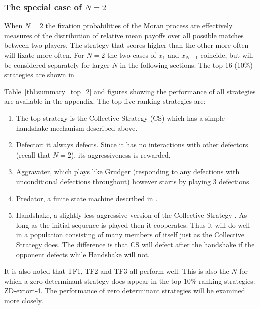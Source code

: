 \documentclass[10pt,letterpaper]{article}
\begin{document}
\subsubsection*{The special case of \(N=2\)}

When $N=2$ the fixation probabilities of the Moran process are effectively measures
of the distribution of  relative
mean payoffs over all possible matches between two players. The strategy
that scores higher than the other more often will fixate more often. For \(N=2\)
the two cases of \(x_1\) and \(x_{N-1}\) coincide, but will be
considered separately for larger \(N\) in the following sections.
The top 16 (10\%) strategies are
shown in

Table~\ref{tbl:summary_top_2} and figures showing the performance of all
strategies are available in the appendix.
The top five ranking strategies are:

\begin{enumerate}
    \item The top strategy is the Collective Strategy (CS) which has a simple
        handshake mechanism described above.
    \item Defector: it always defects. Since it has no interactions with other
        defectors (recall that \(N=2\)), its aggressiveness is rewarded.
    \item Aggravater, which plays like Grudger (responding to any
        defections with unconditional defections throughout) however starts by
        playing 3 defections.
    \item Predator, a finite state machine described in \cite{Ashlock2006}.
    \item Handshake, a slightly less aggressive version of the Collective
        Strategy \cite{Robson1990}. As long as the initial sequence is played
        then it cooperates. Thus it will do well in a population consisting of
        many members of itself just as the Collective Strategy does. The
        difference is that CS will defect after the handshake if the opponent
        defects while Handshake will not.
\end{enumerate}

It is also noted that TF1, TF2 and TF3 all perform well. This is also the \(N\)
for which a zero determinant strategy does appear in the top 10\% ranking
strategies: ZD-extort-4. The performance of zero determinant strategies will be
examined more closely.
\end{document}
